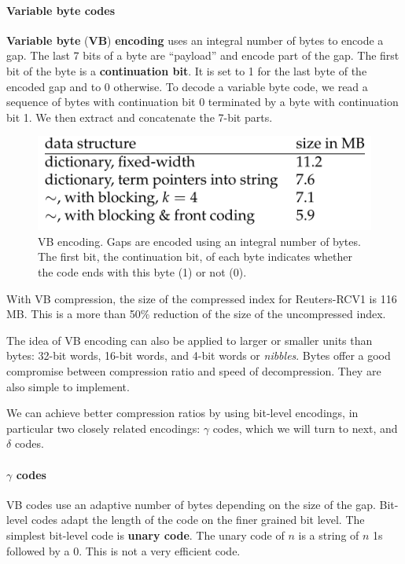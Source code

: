 \documentclass[letterpaper,11pt]{article}
\begin{document}
\paragraph{Variable byte codes}
\textbf{Variable byte} (\textbf{VB}) \textbf{encoding} uses an integral number of bytes to encode a gap. The last 7 bits of a byte are “payload” and encode part of the gap. The first bit of the byte is a \textbf{continuation bit}. It is set to 1 for the last byte of the encoded gap and to 0 otherwise. To decode a variable byte code, we read a sequence of bytes with continuation bit 0 terminated by a byte with continuation bit 1. We then extract and concatenate the 7-bit parts.
\begin{figure}[H]
    \centering
    \includegraphics[scale=0.60]{sect5/table_5_4.png}
    \caption{VB encoding. Gaps are encoded using an integral number of bytes. The first bit, the continuation bit, of each byte indicates whether the code ends with this byte (1) or not (0).}
\end{figure}
With VB compression, the size of the compressed index for Reuters-RCV1 is 116 MB. This is a more than 50\% reduction of the size of the uncompressed index. 

The idea of VB encoding can also be applied to larger or smaller units than bytes: 32-bit words, 16-bit words, and 4-bit words or \textit{nibbles}. Bytes offer a good compromise between compression ratio and speed of decompression. They are also simple to implement. 

We can achieve better compression ratios by using bit-level encodings, in particular two closely related encodings: $\gamma$ codes, which we will turn to next, and $\delta$ codes.

\paragraph{$\gamma$ codes}
VB codes use an adaptive number of bytes depending on the size of the gap. Bit-level codes adapt the length of the code on the finer grained bit level. The simplest bit-level code is \textbf{unary code}. The unary code of $n$ is a string of $n$ 1s followed by a 0. This is not a very efficient code.
\end{document}
